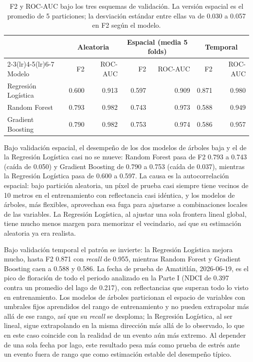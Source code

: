 \documentclass[10pt,a4paper]{article}
\begin{document}
\begin{table}[H]
  \centering
  \small
  \begin{tabular}{lrrrrrr}
    \toprule
    & \multicolumn{2}{c}{Aleatoria} & \multicolumn{2}{c}{Espacial (media 5 folds)} & \multicolumn{2}{c}{Temporal} \\
    \cmidrule(lr){2-3}\cmidrule(lr){4-5}\cmidrule(lr){6-7}
    Modelo & F2 & ROC-AUC & F2 & ROC-AUC & F2 & ROC-AUC \\
    \midrule
    Regresión Logística & 0.600 & 0.913 & 0.597 & 0.909 & 0.871 & 0.980 \\
    Random Forest       & 0.793 & 0.982 & 0.743 & 0.973 & 0.588 & 0.949 \\
    Gradient Boosting   & 0.790 & 0.982 & 0.753 & 0.974 & 0.586 & 0.957 \\
    \bottomrule
  \end{tabular}
  \caption{F2 y ROC-AUC bajo los tres esquemas de validación. La versión espacial es el promedio de 5 particiones;
  la desviación estándar entre ellas va de 0.030 a 0.057 en F2 según el modelo.}
\end{table}

Bajo validación espacial, el desempeño de los dos modelos de árboles baja y el de la Regresión Logística casi no se
mueve: Random Forest pasa de F2 0.793 a 0.743 (caída de 0.050) y Gradient Boosting de 0.790 a 0.753 (caída de
0.037), mientras la Regresión Logística pasa de 0.600 a 0.597. La causa es la autocorrelación espacial: bajo
partición aleatoria, un píxel de prueba casi siempre tiene vecinos de 10 metros en el entrenamiento con
reflectancia casi idéntica, y los modelos de árboles, más flexibles, aprovechan esa fuga para ajustarse a
combinaciones locales de las variables. La Regresión Logística, al ajustar una sola frontera lineal global, tiene
mucho menos margen para memorizar el vecindario, así que su estimación aleatoria ya era realista.

Bajo validación temporal el patrón se invierte: la Regresión Logística mejora mucho, hasta F2 0.871 con
\textit{recall} de 0.955, mientras Random Forest y Gradient Boosting caen a 0.588 y 0.586. La fecha de prueba de
Amatitlán, 2026-06-19, es el pico de floración de todo el periodo analizado en la Parte I (NDCI de 0.397 contra un
promedio del lago de 0.217), con reflectancias que superan todo lo visto en entrenamiento. Los modelos de árboles
particionan el espacio de variables con umbrales fijos aprendidos del rango de entrenamiento y no pueden extrapolar
más allá de ese rango, así que su \textit{recall} se desploma; la Regresión Logística, al ser lineal, sigue
extrapolando en la misma dirección más allá de lo observado, lo que en este caso coincide con la realidad de un
evento aún más extremo. Al depender de una sola fecha por lago, este resultado pesa más como prueba de estrés ante
un evento fuera de rango que como estimación estable del desempeño típico.
\end{document}
